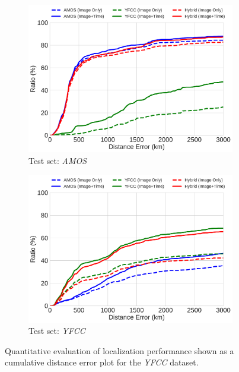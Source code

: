 \documentclass{bmvc2k}
\begin{document}
\begin{figure}
  \centering
  
  \begin{subfigure}[b]{0.47\linewidth}
    \includegraphics[width=\linewidth]{image_localization/amos}
    \caption{Test set: {\em AMOS}}
  \end{subfigure}
  \begin{subfigure}[b]{0.47\linewidth}
    \includegraphics[width=\linewidth]{image_localization/yfcc}
    \caption{Test set: {\em YFCC}}
  \end{subfigure}
  
  \caption{Quantitative evaluation of localization performance shown
  as a cumulative distance error plot for the {\em YFCC} dataset.}
  
  \label{fig:image_localization}
\end{figure}
%
\end{document}
